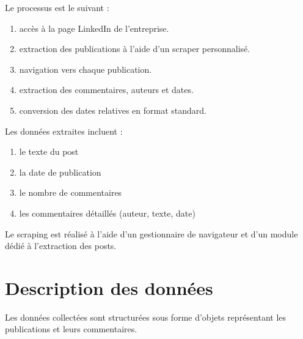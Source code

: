 \documentclass[12pt,a4paper,oneside]{report}
\begin{document}
Le processus est le suivant :

\begin{enumerate}
    \item accès à la page LinkedIn de l’entreprise.
    \item extraction des publications à l’aide d’un scraper personnalisé.
    \item navigation vers chaque publication.
    \item extraction des commentaires, auteurs et dates.
    \item conversion des dates relatives en format standard.
\end{enumerate}
Les données extraites incluent :

\begin{enumerate}
    \item le texte du post
    \item la date de publication
    \item le nombre de commentaires
    \item les commentaires détaillés (auteur, texte, date)
\end{enumerate}

Le scraping est réalisé à l’aide d’un gestionnaire de navigateur et d’un module dédié à l’extraction des posts.



\section{Description des données}
Les données collectées sont structurées sous forme d’objets représentant les publications et leurs commentaires.
\end{document}
